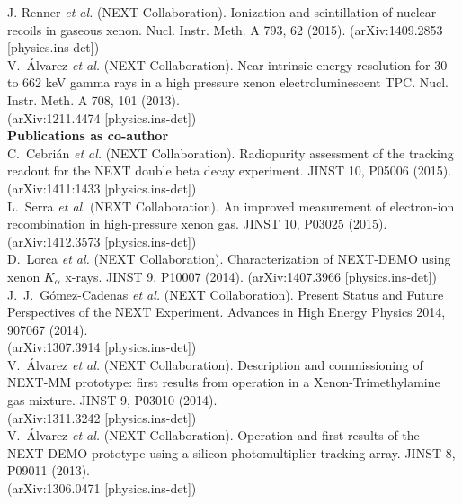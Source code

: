 \noindent J. Renner \emph{et al.} (NEXT Collaboration).  Ionization and scintillation of nuclear recoils in gaseous xenon.  Nucl. Instr. Meth. A 793, 62 (2015).  (arXiv:1409.2853 [physics.ins-det])\\

\noindent V.\ \'{A}lvarez \emph{et al.} (NEXT Collaboration). Near-intrinsic energy resolution for 30 to 662 keV gamma rays in a high pressure xenon electroluminescent TPC. Nucl. Instr. Meth. A 708, 
101 (2013).\\(arXiv:1211.4474 [physics.ins-det])\\

\noindent \textbf{Publications as co-author}\\

\noindent C.\ Cebri\'an \emph{et al.} (NEXT Collaboration). Radiopurity assessment of the tracking readout for the NEXT double beta decay experiment.
JINST 10, P05006 (2015).  (arXiv:1411:1433 [physics.ins-det])\\

\noindent L.\ Serra \emph{et al.} (NEXT Collaboration). An improved measurement of electron-ion recombination in high-pressure xenon gas.
JINST 10, P03025 (2015).  (arXiv:1412.3573 [physics.ins-det])\\

\noindent D.\ Lorca \emph{et al.} (NEXT Collaboration). Characterization of NEXT-DEMO using xenon $K_{\alpha}$ x-rays.
JINST 9, P10007 (2014).  (arXiv:1407.3966 [physics.ins-det])\\

\newpage
\noindent J.\ J.\ G\'{o}mez-Cadenas \emph{et al.} (NEXT Collaboration). Present Status and Future Perspectives of the NEXT Experiment.  Advances in High Energy Physics 2014, 907067
(2014).\\(arXiv:1307.3914 [physics.ins-det])\\

\noindent V.\ \'{A}lvarez \emph{et al.} (NEXT Collaboration). Description and commissioning of NEXT-MM prototype: first results from operation in a Xenon-Trimethylamine gas mixture.
JINST 9, P03010 (2014).\\(arXiv:1311.3242 [physics.ins-det])\\

\noindent V.\ \'{A}lvarez \emph{et al.} (NEXT Collaboration). Operation and first results of the NEXT-DEMO prototype using a silicon photomultiplier tracking array.
JINST 8, P09011 (2013).\\(arXiv:1306.0471 [physics.ins-det])\\

